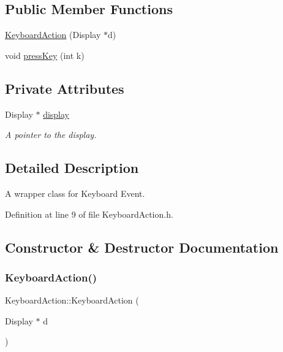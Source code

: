 \subsection*{Public Member Functions}
\begin{DoxyCompactItemize}
\item 
\hyperlink{class_ubuntu_controller_1_1_keyboard_action_af59163694e9b55ceaa75d779363e7fc9}{Keyboard\+Action} (Display $\ast$d)
\item 
void \hyperlink{class_ubuntu_controller_1_1_keyboard_action_ab09e3956685d6fb11cd1cdf86a673b48}{press\+Key} (int k)
\end{DoxyCompactItemize}
\subsection*{Private Attributes}
\begin{DoxyCompactItemize}
\item 
Display $\ast$ \hyperlink{class_ubuntu_controller_1_1_keyboard_action_abd7bb1af29077e744e9226f6bf1ecab7}{display}
\begin{DoxyCompactList}\small\item\em A pointer to the display. \end{DoxyCompactList}\end{DoxyCompactItemize}


\subsection{Detailed Description}
A wrapper class for Keyboard Event. 

Definition at line 9 of file Keyboard\+Action.\+h.



\subsection{Constructor \& Destructor Documentation}
\mbox{\label{class_ubuntu_controller_1_1_keyboard_action_af59163694e9b55ceaa75d779363e7fc9}} 
\subsubsection{\texorpdfstring{Keyboard\+Action()}{KeyboardAction()}}
{\footnotesize\ttfamily Keyboard\+Action\+::\+Keyboard\+Action (\begin{DoxyParamCaption}\item[{Display $\ast$}]{d }\end{DoxyParamCaption})}

